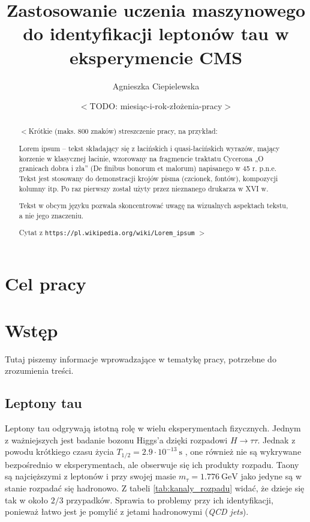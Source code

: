 \documentclass{pracalicmgr}
\author{Agnieszka Ciepielewska}
\title{Zastosowanie uczenia maszynowego do identyfikacji leptonów tau w eksperymencie CMS}
\date{$<$TODO: miesiąc-i-rok-złożenia-pracy$>$}
\begin{document}
    \maketitle
    \let\cleardoublepage\clearpage
    
    \begin{abstract}
$<$Krótkie (maks. 800 znaków) streszczenie pracy, na przykład:

Lorem ipsum – tekst składający się z łacińskich i quasi-łacińskich wyrazów, mający korzenie w klasycznej łacinie, wzorowany na fragmencie traktatu Cycerona „O granicach dobra i zła” (De finibus bonorum et malorum) napisanego w 45 r. p.n.e. Tekst jest stosowany do demonstracji krojów pisma (czcionek, fontów), kompozycji kolumny itp. Po raz pierwszy został użyty przez nieznanego drukarza w XVI w.

Tekst w obcym języku pozwala skoncentrować uwagę na wizualnych aspektach tekstu, a nie jego znaczeniu.

Cytat z {\tt https://pl.wikipedia.org/wiki/Lorem\_ipsum}
$>$

    \end{abstract}

    \tableofcontents
    
    \chapter*{Cel pracy}
    \chapter{Wstęp}
    \label{ch:wstep}
    Tutaj piszemy informacje wprowadzające w tematykę  pracy, potrzebne do zrozumienia treści.       
    \section{Leptony tau}
    
    Leptony tau	odgrywają istotną rolę w wielu eksperymentach fizycznych. Jednym z ważniejszych jest badanie bozonu Higgs'a dzięki rozpadowi $H \rightarrow \tau\tau$. Jednak z powodu krótkiego czasu życia $T_{1/2} = 2.9 \cdot 10^{-13}~\mathrm{s}$ \cite{particle_physics}, one również nie są wykrywane bezpośrednio w eksperymentach, ale obserwuje się ich produkty rozpadu. Taony są najcięższymi z leptonów i przy swojej masie $m_\tau = 1.776 ~\mathrm{GeV}$ \cite{particle_physics} jako jedyne są w stanie rozpadać się hadronowo. Z tabeli \ref{tab:kanaly_rozpadu} widać, że dzieje się tak w około $2/3$ przypadków. Sprawia to problemy przy ich identyfikacji, ponieważ łatwo jest je pomylić z jetami hadronowymi (\textit{QCD jets}).
    
\end{document}
